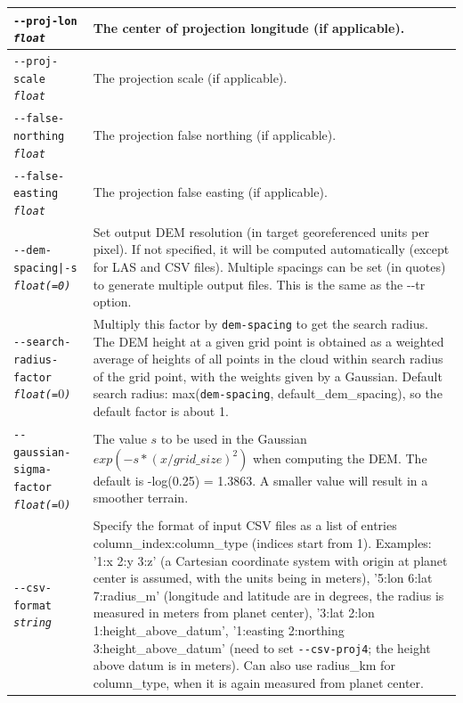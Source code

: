 \begin{longtable}{|p{8cm}|p{9cm}|}
\texttt{-\/-proj-lon \textit{float}} & The center of projection longitude (if applicable). \\ \hline
\texttt{-\/-proj-scale \textit{float}} & The projection scale (if applicable). \\ \hline
\texttt{-\/-false-northing \textit{float}} & The projection false northing (if applicable). \\ \hline
\texttt{-\/-false-easting \textit{float}} & The projection false easting (if applicable). \\ \hline
\texttt{-\/-dem-spacing|-s \textit{float(=0)}} & Set output DEM resolution (in target georeferenced units per pixel). If not specified, it will be computed automatically (except for LAS and CSV files). Multiple spacings can be set (in quotes) to generate multiple output files. This is the same as the -\/-tr option. \\ \hline

\texttt{-\/-search-radius-factor \textit{float(=$0$)}} & Multiply this factor by \texttt{dem-spacing} to get the search radius. The DEM height at a given grid point is obtained as a weighted average of heights of all points in the cloud within search radius of the grid point, with the weights given by a Gaussian. Default search radius: max(\texttt{dem-spacing}, default\_dem\_spacing), so the default factor is about 1.\\ \hline

\texttt{-\/-gaussian-sigma-factor \textit{float(=$0$)}} & The value $s$ to be used in the Gaussian $exp(-s*(x/grid\_size)^2)$ when computing the DEM. The default is -log(0.25) = 1.3863. A smaller value will result in a smoother terrain. \\ \hline
 
\texttt{-\/-csv-format \textit{string}} & Specify the format of input
CSV files as a list of entries column\_index:column\_type (indices start
from 1). Examples: '1:x 2:y 3:z' (a Cartesian coordinate system with
origin at planet center is assumed, with the units being in meters),
'5:lon 6:lat 7:radius\_m' (longitude and latitude are in degrees, the
radius is measured in meters from planet center), '3:lat 2:lon
1:height\_above\_datum', '1:easting 2:northing 3:height\_above\_datum'
(need to set \texttt{-\/-csv-proj4}; the height above datum is in
meters). Can also use radius\_km for column\_type, when it is again
measured from planet center. \\ \hline


\end{longtable}
